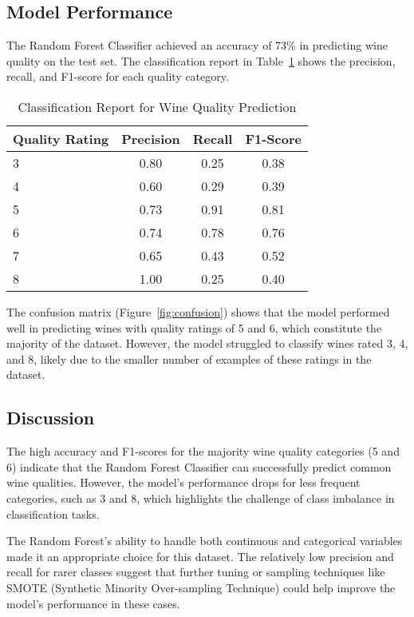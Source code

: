 \documentclass{article}
\begin{document}
\subsection{Model Performance}
The Random Forest Classifier achieved an accuracy of 73\% in predicting wine quality on the test set. The classification report in Table~\ref{tab:performance} shows the precision, recall, and F1-score for each quality category.

\begin{table}[h]
\centering
\caption{Classification Report for Wine Quality Prediction}
\label{tab:performance}
\begin{tabular}{lccc}
\toprule
Quality Rating & Precision & Recall & F1-Score \\
\midrule
3              & 0.80      & 0.25   & 0.38     \\
4              & 0.60      & 0.29   & 0.39     \\
5              & 0.73      & 0.91   & 0.81     \\
6              & 0.74      & 0.78   & 0.76     \\
7              & 0.65      & 0.43   & 0.52     \\
8              & 1.00      & 0.25   & 0.40     \\
\bottomrule
\end{tabular}
\end{table}

The confusion matrix (Figure~\ref{fig:confusion}) shows that the model performed well in predicting wines with quality ratings of 5 and 6, which constitute the majority of the dataset. However, the model struggled to classify wines rated 3, 4, and 8, likely due to the smaller number of examples of these ratings in the dataset.

\subsection{Discussion}
The high accuracy and F1-scores for the majority wine quality categories (5 and 6) indicate that the Random Forest Classifier can successfully predict common wine qualities. However, the model's performance drops for less frequent categories, such as 3 and 8, which highlights the challenge of class imbalance in classification tasks. 

The Random Forest's ability to handle both continuous and categorical variables made it an appropriate choice for this dataset. The relatively low precision and recall for rarer classes suggest that further tuning or sampling techniques like SMOTE (Synthetic Minority Over-sampling Technique) could help improve the model’s performance in these cases.
\end{document}
